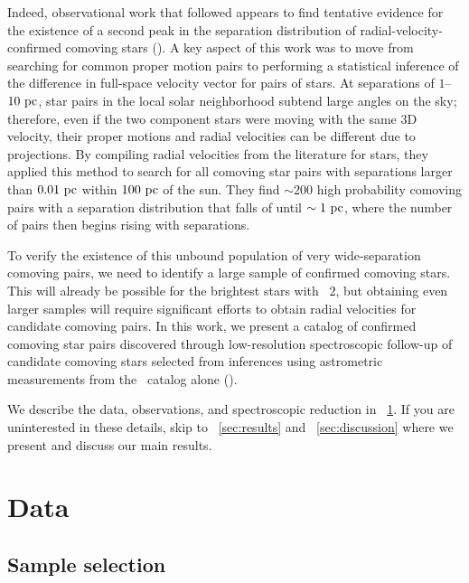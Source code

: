 \documentclass[modern, letterpaper]{aastex61}
\newcommand{\gaia}{\project{Gaia}}
\newcommand{\DR}[1]{\acronym{DR}#1}
\newcommand{\tgas}{\acronym{TGAS}}
\begin{document}
Indeed, observational work that followed appears to find tentative evidence for
the existence of a second peak in the separation distribution of
radial-velocity-confirmed comoving stars (\citealt{Shaya:2011}).
A key aspect of this work was to move from searching for common proper motion
pairs to performing a statistical inference of the difference in full-space
velocity vector for pairs of stars.
At separations of $1$--$10~\mathrm{pc}$, star pairs in the local solar neighborhood
subtend large angles on the sky; therefore, even if the two component stars were
moving with the same 3D velocity, their proper motions and radial velocities
can be different due to projections.
By compiling radial velocities from the literature for 
stars, they applied this method to search for all comoving star pairs with
separations larger than $0.01~\mathrm{pc}$ within $100~\mathrm{pc}$ of the sun.
They find $\sim 200$ high probability comoving pairs with a separation
distribution that falls of until $\sim 1~\mathrm{pc}$, where the number of pairs then
begins rising with separations.

To verify the existence of this unbound population of very wide-separation
comoving pairs, we need to identify a large sample of confirmed comoving stars.
This will already be possible for the brightest stars with \gaia\ \DR{2}, but
obtaining even larger samples will require significant efforts to obtain radial
velocities for candidate comoving pairs.
In this work, we present a catalog of confirmed comoving star pairs discovered
through low-resolution spectroscopic follow-up of candidate comoving stars
selected from inferences using astrometric measurements from the \tgas\ catalog
alone (\citealt{Oh:2017}).

We describe the data, observations, and spectroscopic reduction in
\sectionname~\ref{sec:data}.
If you are uninterested in these details, skip to \sectionname~\ref{sec:results}
and \sectionname~\ref{sec:discussion} where we present and discuss our main
results.

\section{Data}\label{sec:data}

\subsection{Sample selection}\label{sec:sample}
\end{document}
